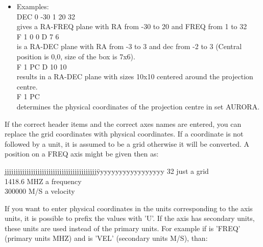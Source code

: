 \begin{itemize}             
        
     \item   Examples: \\

          DEC 0  -30 1 20 32 \\
        gives a RA-FREQ plane with RA from -30 to 20 and FREQ from 1 to 32 \\

          F 1    0 0 D 7 6 \\
        is a RA-DEC plane with RA from -3 to 3 and dec from -2 to 3
        (Central position is 0,0, size of the box is 7x6).\\

          F 1  PC D 10 10 \\
        results in a RA-DEC plane with sizes 10x10 centered around the
        projection centre.\\

          F 1  PC \\
        determines the physical coordinates of the projection centre in
        set AURORA.\\

\end {itemize}             
If the correct header items and the correct axes names are entered,
you can replace the grid coordinates with physical coordinates.  If a 
coordinate is not followed by a unit, it is assumed to be a grid otherwise it 
will be converted. A position on a FREQ axis might be given then as:

\begin{tabbing}
        jjjjjjjjjjjjjjjjjjjjjjjjjjjjjjjjjjjjjjjjjj\=yyyyyyyyyyyyyyyyyy\kill
        32   \> just a grid \\
        1418.6 MHZ \> a frequency \\
        300000 M/S \> a velocity \\
\end{tabbing}

If you want to enter physical coordinates in the units corresponding to 
the axis units, it is possible to prefix the values with 'U'. If the axis 
has secondary units, these units are used instead of the primary units. 
For example if  is 'FREQ' (primary units MHZ) and 
 is 'VEL' 
(secondary units M/S), than:

